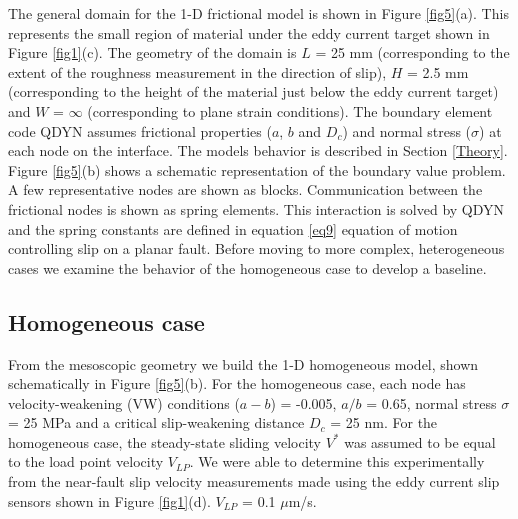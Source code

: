 \documentclass[draft]{agujournal2019}
\begin{document}
The general domain for the 1-D frictional model is shown in Figure \ref{fig5}(a). This represents the small region of material under the eddy current target shown in Figure \ref{fig1}(c). The geometry of the domain is $L$ = 25 mm (corresponding to the extent of the roughness measurement in the direction of slip), $H$ = 2.5 mm (corresponding to the height of the material just below the eddy current target) and $W$ = $\infty$ (corresponding to plane strain conditions). The boundary element code QDYN assumes frictional properties ($a$, $b$ and $D_{c}$) and normal stress ($\sigma$) at each node on the interface. The models behavior is described in Section \ref{Theory}. Figure \ref{fig5}(b) shows a schematic representation of the boundary value problem. A few representative nodes are shown as blocks. Communication between the frictional nodes is shown as spring elements. This interaction is solved by QDYN  and the spring constants are defined in equation \eqref{eq9} equation of motion controlling slip on a planar fault. Before moving to more complex, heterogeneous cases we examine the behavior of the homogeneous case to develop a baseline.    

\subsection{Homogeneous case}

From the mesoscopic geometry we build the 1-D homogeneous model, shown schematically in Figure \ref{fig5}(b). For the homogeneous case, each node has velocity-weakening (VW) conditions ($a-b$) = -0.005, $a/b$ = 0.65, normal stress $\sigma$ = 25 MPa and a critical slip-weakening distance $D_{c}$ = 25 nm. For the homogeneous case, the steady-state sliding velocity $V^{*}$ was assumed to be equal to the load point velocity $V_{LP}$. We were able to determine this experimentally from the near-fault slip velocity measurements made using the eddy current slip sensors shown in Figure \ref{fig1}(d). $V_{LP}$ = 0.1 $\mu$m/s.
\end{document}
